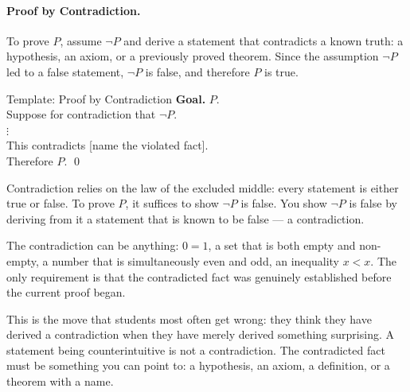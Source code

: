 \paragraph{Proof by Contradiction.}

To prove $P$, assume $\neg P$ and derive a statement that contradicts
a known truth: a hypothesis, an axiom, or a previously proved theorem.
Since the assumption $\neg P$ led to a false statement, $\neg P$ is
false, and therefore $P$ is true.

\begin{propositionbox}{Template: Proof by Contradiction}
\textbf{Goal.} $P$.\\[4pt]
Suppose for contradiction that $\neg P$.\\
$\vdots$ \\
This contradicts [name the violated fact].\\
Therefore $P$. \qed
\end{propositionbox}

\begin{remark}
Contradiction relies on the law of the excluded middle: every statement
is either true or false. To prove $P$, it suffices to show $\neg P$
is false. You show $\neg P$ is false by deriving from it a statement
that is known to be false --- a contradiction.

The contradiction can be anything: $0 = 1$, a set that is both empty
and non-empty, a number that is simultaneously even and odd, an
inequality $x < x$. The only requirement is that the contradicted fact
was genuinely established before the current proof began.

This is the move that students most often get wrong: they think they
have derived a contradiction when they have merely derived something
surprising. A statement being counterintuitive is not a contradiction.
The contradicted fact must be something you can point to:
a hypothesis, an axiom, a definition, or a theorem with a name.
\end{remark}

